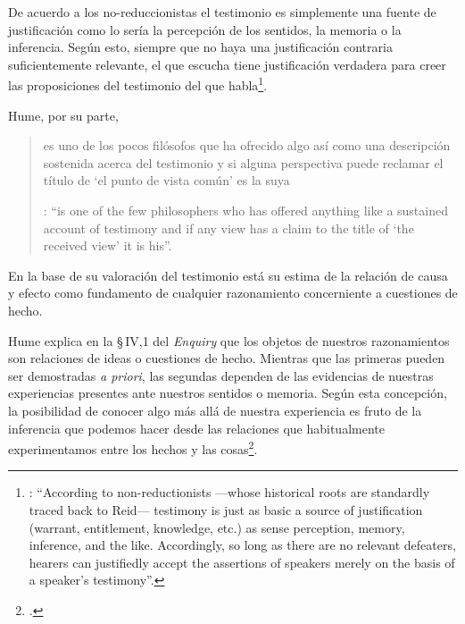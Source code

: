 De acuerdo a los no-reduccionistas el testimonio es simplemente una fuente de justificación como lo sería la percepción de los sentidos, la memoria o la inferencia. Según esto, siempre que no haya una justificación contraria suficientemente relevante, el que escucha tiene justificación verdadera para creer las proposiciones del testimonio del que habla\footnote{\cite[Cf.][4]{lackeysosa2006eptest}: \enquote{According to non-reductionists ---whose historical roots are standardly traced back to Reid--- testimony is just as basic a source of justification (warrant, entitlement, knowledge, etc.) as sense perception, memory, inference, and the like. Accordingly, so long as there are no relevant defeaters, hearers can justifiedly accept the assertions of speakers merely on the basis of a speaker's testimony}.}.

Hume, por su parte, \blockquote[{\Cite[79]{coady1992test}}: \enquote{is one of the few philosophers who has offered anything like a sustained account of testimony and if any view has a claim to the title of `the received view' it is his}.]{es uno de los pocos filósofos que ha ofrecido algo así como una descripción sostenida acerca del testimonio y si alguna perspectiva puede reclamar el título de `el punto de vista común' es la suya}. En la base de su valoración del testimonio está su estima de la relación de causa y efecto como fundamento de cualquier razonamiento concerniente a cuestiones de hecho.

Hume explica en la \S\,IV,1 del \emph{Enquiry} que los objetos de nuestros razonamientos son relaciones de ideas o cuestiones de hecho. Mientras que las primeras pueden ser demostradas \emph{a priori}, las segundas dependen de las evidencias de nuestras experiencias presentes ante nuestros sentidos o memoria. Según esta concepción, la posibilidad de conocer algo más allá de nuestra experiencia es fruto de la inferencia que podemos hacer desde las relaciones que habitualmente experimentamos entre los hechos y las cosas\footnote{\cite[Cf.][IV, 1. 15-20]{hume1777enquiry}.}.

